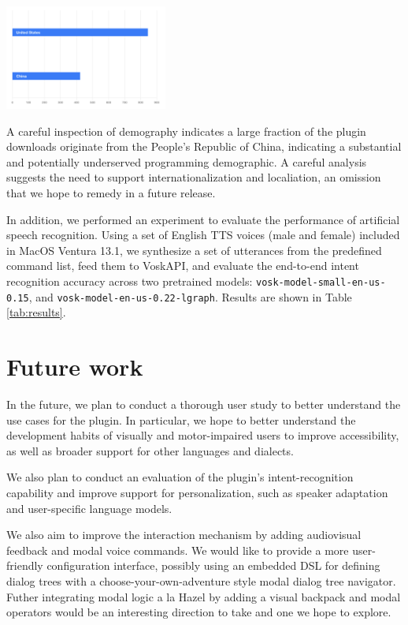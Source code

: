 \documentclass[conference]{IEEEtran}
\begin{document}
\begin{center}\includegraphics[width=0.40\textwidth]{demographics.png}\end{center}

A careful inspection of demography indicates a large fraction of the plugin downloads originate from the People's Republic of China, indicating a substantial and potentially underserved programming demographic. A careful analysis suggests the need to support internationalization and localiation, an omission that we hope to remedy in a future release.

In addition, we performed an experiment to evaluate the performance of artificial speech recognition. Using a set of English TTS voices (male and female) included in MacOS Ventura 13.1, we synthesize a set of utterances from the predefined command list, feed them to VoskAPI, and evaluate the end-to-end intent recognition accuracy across two pretrained models: \texttt{vosk-model-small-en-us-0.15}, and \texttt{vosk-model-en-us-0.22-lgraph}. Results are shown in Table \ref{tab:results}.

\section{Future work}

In the future, we plan to conduct a thorough user study to better understand the use cases for the plugin. In particular, we hope to better understand the development habits of visually and motor-impaired users to improve accessibility, as well as broader support for other languages and dialects.

We also plan to conduct an evaluation of the plugin's intent-recognition capability and improve support for personalization, such as speaker adaptation and user-specific language models.

We also aim to improve the interaction mechanism by adding audiovisual feedback and modal voice commands. We would like to provide a more user-friendly configuration interface, possibly using an embedded DSL for defining dialog trees with a choose-your-own-adventure style modal dialog tree navigator. Futher integrating modal logic a la Hazel by adding a visual backpack and modal operators would be an interesting direction to take and one we hope to explore.
\end{document}
